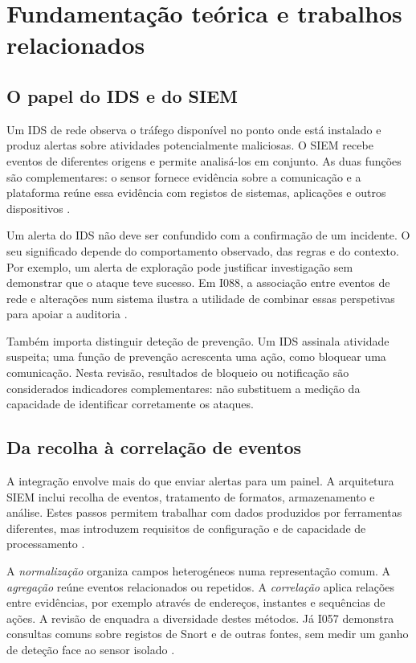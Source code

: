 \documentclass[11pt,a4paper]{article}
\begin{document}
\section{Fundamentação teórica e trabalhos relacionados}
\subsection{O papel do IDS e do SIEM}
Um IDS de rede observa o tráfego disponível no ponto onde está instalado e produz alertas sobre atividades potencialmente maliciosas. O SIEM recebe eventos de diferentes origens e permite analisá-los em conjunto. As duas funções são complementares: o sensor fornece evidência sobre a comunicação e a plataforma reúne essa evidência com registos de sistemas, aplicações e outros dispositivos \citep{gonzalez2021}.

Um alerta do IDS não deve ser confundido com a confirmação de um incidente. O seu significado depende do comportamento observado, das regras e do contexto. Por exemplo, um alerta de exploração pode justificar investigação sem demonstrar que o ataque teve sucesso. Em I088, a associação entre eventos de rede e alterações num sistema ilustra a utilidade de combinar essas perspetivas para apoiar a auditoria \citep{ossimaudit2015}.

Também importa distinguir deteção de prevenção. Um IDS assinala atividade suspeita; uma função de prevenção acrescenta uma ação, como bloquear uma comunicação. Nesta revisão, resultados de bloqueio ou notificação são considerados indicadores complementares: não substituem a medição da capacidade de identificar corretamente os ataques.

\subsection{Da recolha à correlação de eventos}
A integração envolve mais do que enviar alertas para um painel. A arquitetura SIEM inclui recolha de eventos, tratamento de formatos, armazenamento e análise. Estes passos permitem trabalhar com dados produzidos por ferramentas diferentes, mas introduzem requisitos de configuração e de capacidade de processamento \citep{manzoor2024}.

A \textit{normalização} organiza campos heterogéneos numa representação comum. A \textit{agregação} reúne eventos relacionados ou repetidos. A \textit{correlação} aplica relações entre evidências, por exemplo através de endereços, instantes e sequências de ações. A revisão de \citet{kotenko2022} enquadra a diversidade destes métodos. Já I057 demonstra consultas comuns sobre registos de Snort e de outras fontes, sem medir um ganho de deteção face ao sensor isolado \citep{normalisation2014}.
\end{document}
